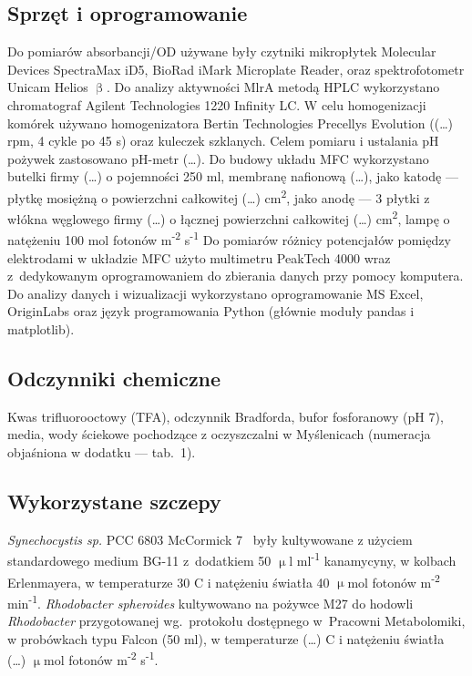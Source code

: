 \subsection{Sprzęt i oprogramowanie}\label{subsec:sprzet}
Do pomiarów absorbancji/OD używane były czytniki mikropłytek
Molecular Devices SpectraMax iD5, BioRad iMark
Microplate Reader, oraz spektrofotometr Unicam Helios $\upbeta$.
Do analizy aktywności MlrA metodą HPLC wykorzystano chromatograf
Agilent Technologies 1220 Infinity LC\@.
W celu homogenizacji komórek używano homogenizatora
Bertin Technologies Precellys Evolution ((\ldots) rpm, 4 cykle po 45 s)
oraz kuleczek szklanych.
Celem pomiaru i ustalania pH pożywek zastosowano pH-metr (\ldots).
Do budowy układu MFC wykorzystano butelki firmy (\ldots)
o pojemności 250 ml, membranę nafionową (\ldots),
jako katodę — płytkę mosiężną o powierzchni całkowitej (\ldots)
cm\textsuperscript{2}, jako anodę — 3 płytki z włókna węglowego firmy
(\ldots) o łącznej powierzchni całkowitej (\ldots) cm\textsuperscript{2},
lampę o natężeniu 100 mol fotonów m\textsuperscript{-2} s\textsuperscript{-1}
Do pomiarów różnicy potencjałów pomiędzy elektrodami
w układzie MFC użyto multimetru PeakTech 4000 wraz
z~dedykowanym oprogramowaniem do zbierania danych przy pomocy komputera.
Do analizy danych i wizualizacji wykorzystano oprogramowanie
MS Excel, OriginLabs oraz język programowania Python
(głównie moduły pandas i matplotlib).

\subsection{Odczynniki chemiczne}\label{subsec:odczynniki}
Kwas trifluorooctowy (TFA), odczynnik Bradforda, bufor fosforanowy (pH 7),
media, wody ściekowe pochodzące z oczyszczalni w Myślenicach
(numeracja objaśniona w dodatku — tab.\ 1).

\subsection{Wykorzystane szczepy}\label{subsec:szczepy}
\textit{Synechocystis sp.} PCC 6803 McCormick 7~\cite{Puchalski2021}
były kultywowane z użyciem standardowego medium BG-11 z~dodatkiem 50
$\upmu$l ml\textsuperscript{-1} kanamycyny, w kolbach Erlenmayera,
w temperaturze 30 \degree C i natężeniu światła
40 $\upmu$mol fotonów m\textsuperscript{-2} min\textsuperscript{-1}.
\textit{Rhodobacter spheroides} kultywowano na pożywce M27
do hodowli \textit{Rhodobacter} przygotowanej wg.\ protokołu
dostępnego w~Pracowni Metabolomiki, w probówkach typu
Falcon (50 ml), w temperaturze (\ldots) \degree C i natężeniu światła
(\ldots) $\upmu$mol fotonów m\textsuperscript{-2} s\textsuperscript{-1}.

